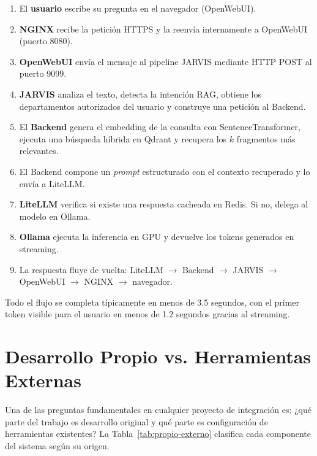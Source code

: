 \begin{enumerate}
    \item El \textbf{usuario} escribe su pregunta en el navegador (OpenWebUI).
    \item \textbf{NGINX} recibe la petición HTTPS y la reenvía internamente a OpenWebUI (puerto 8080).
    \item \textbf{OpenWebUI} envía el mensaje al pipeline JARVIS mediante HTTP POST al puerto 9099.
    \item \textbf{JARVIS} analiza el texto, detecta la intención RAG, obtiene los departamentos autorizados del usuario y construye una petición al Backend.
    \item El \textbf{Backend} genera el embedding de la consulta con SentenceTransformer, ejecuta una búsqueda híbrida en Qdrant y recupera los $k$ fragmentos más relevantes.
    \item El Backend compone un \textit{prompt} estructurado con el contexto recuperado y lo envía a LiteLLM.
    \item \textbf{LiteLLM} verifica si existe una respuesta cacheada en Redis. Si no, delega al modelo en Ollama.
    \item \textbf{Ollama} ejecuta la inferencia en GPU y devuelve los tokens generados en streaming.
    \item La respuesta fluye de vuelta: LiteLLM $\rightarrow$ Backend $\rightarrow$ JARVIS $\rightarrow$ OpenWebUI $\rightarrow$ NGINX $\rightarrow$ navegador.
\end{enumerate}

Todo el flujo se completa típicamente en menos de 3.5 segundos, con el primer token visible para el usuario en menos de 1.2 segundos gracias al streaming.

\section{Desarrollo Propio vs. Herramientas Externas}
\label{sec:propio-vs-externo}

Una de las preguntas fundamentales en cualquier proyecto de integración es: ¿qué parte del trabajo es desarrollo original y qué parte es configuración de herramientas existentes? La Tabla~\ref{tab:propio-externo} clasifica cada componente del sistema según su origen.

